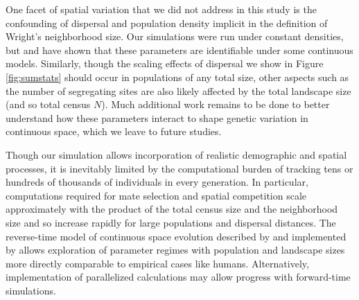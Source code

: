 \documentclass[10pt,twoside,lineno,hidelinks]{preprint}
\begin{document}
One facet of spatial variation that we did not address in this study is the confounding of dispersal and population density implicit in the definition of Wright's neighborhood size. Our simulations were run under constant densities, but \cite{guindon2016demographic} and \citet{Ringbauer2017} have shown that these parameters are identifiable under some continuous models. Similarly, though the scaling effects of dispersal we show in Figure \ref{fig:sumstats} should occur in populations of any total size, other aspects such as the number of segregating sites are also likely affected by the total landscape size (and so total census $N$). Much additional work remains to be done to better understand how these parameters interact to shape genetic variation in continuous space, which we leave to future studies. 

Though our simulation allows incorporation of realistic demographic and spatial processes, 
it is inevitably limited by the computational burden of tracking tens or hundreds of thousands of individuals in every generation. 
In particular, computations required for mate selection and spatial competition scale approximately with the product of the total census size and the neighborhood size and so increase rapidly for large populations and dispersal distances. 
The reverse-time model of continuous space evolution described by \citet{Barton2010} and implemented by \citet{Kelleher2014} 
allows exploration of parameter regimes with population and landscape sizes more directly comparable to empirical cases like humans. 
Alternatively, implementation of parallelized calculations may allow progress with forward-time simulations.


\end{document}
